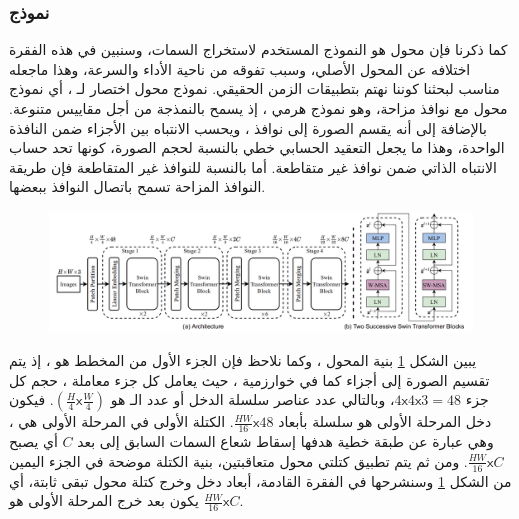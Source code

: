 \subsubsection{نموذج
}
كما ذكرنا فإن محول
هو النموذج المستخدم لاستخراج السمات، وسنبين في هذه الفقرة اختلافه عن المحول الأصلي، وسبب تفوقه من ناحية الأداء والسرعة، وهذا ماجعله مناسب لبحثنا كوننا نهتم بتطبيقات الزمن الحقيقي.
\newline
نموذج محول 
اختصار لـ
،
أي نموذج محول مع نوافذ مزاحة،
وهو نموذج هرمي
،
إذ يسمح بالنمذجة من أجل مقاييس متنوعة. بالإضافة إلى أنه يقسم الصورة إلى نوافذ 
،
ويحسب الانتباه بين الأجزاء ضمن النافذة الواحدة، وهذا ما يجعل التعقيد الحسابي خطي بالنسبة لحجم الصورة، كونها تحد حساب الانتباه الذاتي ضمن نوافذ غير متقاطعة.
أما بالنسبة للنوافذ غير المتقاطعة فإن طريقة النوافذ المزاحة 
تسمح باتصال النوافذ ببعضها.
\begin{figure}[!h]
	\centerline{\includegraphics[width=\textwidth]{images/swin_architecture}}
	\caption{
	}
	\label{fig:swin}
\end{figure}
\newline
يبين الشكل 
\ref{fig:swin}
 بنية المحول
،
وكما نلاحظ فإن الجزء الأول من المخطط هو
،
إذ يتم تقسيم الصورة إلى أجزاء 
كما في خوارزمية
،
حيث يعامل كل جزء معاملة
،
حجم كل جزء
$4\mathsf{x}4\mathsf{x}3 = 48$،
وبالتالي عدد عناصر سلسلة الدخل أو عدد الـ
هو
$(\frac{H}{4} \mathsf{x} \frac{W}{4})$.
فيكون دخل المرحلة الأولى
هو سلسلة بأبعاد
$\frac{HW}{16} \mathsf{x}48$.
\newline
الكتلة الأولى في المرحلة الأولى هي 
،
وهي عبارة عن طبقة خطية هدفها إسقاط شعاع السمات السابق إلى بعد 
$C$
أي يصبح
$\frac{HW}{16}\mathsf{x}C$.
ومن ثم يتم تطبيق كتلتي محول 
متعاقبتين،  بنية الكتلة موضحة في الجزء اليمين من الشكل
\ref{fig:swin}
وسنشرحها في الفقرة القادمة، أبعاد دخل وخرج كتلة محول 
تبقى ثابتة، أي يكون بعد خرج المرحلة الأولى هو
$\frac{HW}{16}\mathsf{x}C$.
